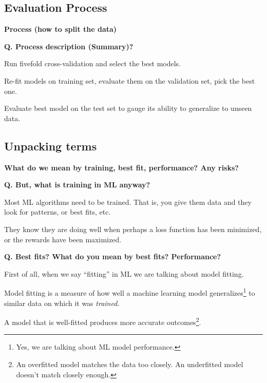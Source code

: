 \subsection{Evaluation Process}
\begin{transitionsubframe}
  \begin{center}
    \Huge \textbf{Process (how to split the data)}
  \end{center}
\end{transitionsubframe}

\begin{frame}[fragile]{\textbf{Q. Process description (Summary)?}}
  \begin{wideitemize}
  \item Run fivefold cross-validation and select the best models.
  \item Re-fit models on training set, evaluate them on the validation set, pick the best one.
  \item Evaluate best model on the test set to gauge its ability
  to generalize to unseen data.
  \end{wideitemize}
\end{frame}

\subsection{Unpacking terms}
\begin{transitionsubframe}
  \begin{center}
    \Huge \textbf{What do we mean by training, best fit, performance? Any risks?}
  \end{center}
\end{transitionsubframe}

\begin{frame}[fragile]{\textbf{Q. But, what is training in ML anyway?}}
  \begin{wideitemize}
    \item Most ML algorithms need to be trained. That is, you give
    them data and they look for patterns, or best fits, etc.
    \item They know they are doing well when perhaps a loss function
    has been minimized, or the rewards have been maximized.
  \end{wideitemize}
\end{frame}

\begin{frame}[fragile]{\textbf{Q. Best fits? What do you mean by best fits? Performance?}}
  \begin{wideitemize}
    \item First of all, when we say ``fitting'' in ML we are talking about model fitting.
    \item Model fitting is a measure of how well a machine learning model
    generalizes\footnote{Yes, we are talking about ML model performance.} to similar data
    on which it was \textit{trained}.
    \item A model that is well-fitted produces more accurate outcomes\footnote{An overfitted model
    matches the data too closely. An underfitted model doesn't match closely enough.}.
  \end{wideitemize}
\end{frame}

